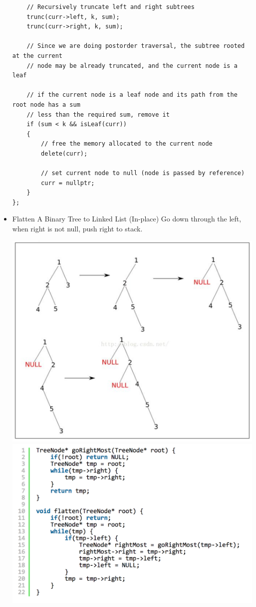 \documentclass[a4paper,11pt,twoside]{book}
\begin{document}
\begin{itemize}
\begin{lstlisting}
	// Recursively truncate left and right subtrees
	trunc(curr->left, k, sum);
	trunc(curr->right, k, sum);
	
	// Since we are doing postorder traversal, the subtree rooted at the current
	// node may be already truncated, and the current node is a leaf
	
	// if the current node is a leaf node and its path from the root node has a sum
	// less than the required sum, remove it
	if (sum < k && isLeaf(curr))
	{
		// free the memory allocated to the current node
		delete(curr);
		
		// set current node to null (node is passed by reference)
		curr = nullptr;
	}
};
\end{lstlisting}

\item Flatten A Binary Tree to Linked List (In-place) 
Go down through the left, when right is not null, push right to stack. \newline

\includegraphics[scale=0.39]{pics/t2l.png} \newline
\includegraphics[scale=0.6]{pics/t2l1.png} \newline

\end{itemize}
\end{document}
